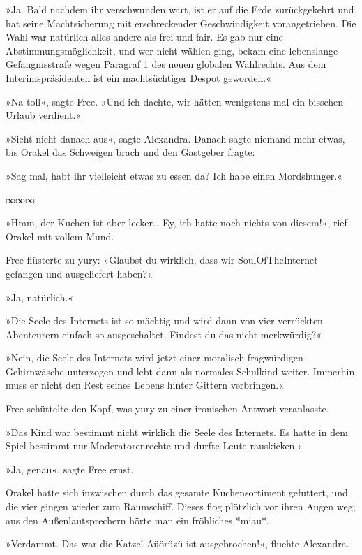 »Ja. Bald nachdem ihr verschwunden wart, ist er auf die Erde zurückgekehrt und hat seine Machtsicherung mit erschreckender Geschwindigkeit vorangetrieben. Die Wahl war natürlich alles andere als frei und fair. Es gab nur eine Abstimmungsmöglichkeit, und wer nicht wählen ging, bekam eine lebenslange Gefängnisstrafe wegen Paragraf 1 des neuen globalen Wahlrechts. Aus dem Interimspräsidenten ist ein machtsüchtiger Despot geworden.«

»Na toll«, sagte Free. »Und ich dachte, wir hätten wenigstens mal ein bisschen Urlaub verdient.«

»Sieht nicht danach aus«, sagte Alexandra. Danach sagte niemand mehr etwas, bis Orakel das Schweigen brach und den Gastgeber fragte:

»Sag mal, habt ihr vielleicht etwas zu essen da? Ich habe einen Mordshunger.«

\begin{center}
    ∞∞∞
\end{center}

»Hmm, der Kuchen ist aber lecker… Ey, ich hatte noch nichts von diesem!«, rief Orakel mit vollem Mund.

Free flüsterte zu yury: »Glaubst du wirklich, dass wir SoulOfTheInternet gefangen und ausgeliefert haben?«

»Ja, natürlich.«

»Die Seele des Internets ist so mächtig und wird dann von vier verrückten Abenteurern einfach so ausgeschaltet. Findest du das nicht merkwürdig?«

»Nein, die Seele des Internets wird jetzt einer moralisch fragwürdigen Gehirnwäsche unterzogen und lebt dann als normales Schulkind weiter. Immerhin muss er nicht den Rest seines Lebens hinter Gittern verbringen.«

Free schüttelte den Kopf, was yury zu einer ironischen Antwort veranlasste.

»Das Kind war bestimmt nicht wirklich die Seele des Internets. Es hatte in dem Spiel bestimmt nur Moderatorenrechte und durfte Leute rauskicken.«

»Ja, genau«, sagte Free ernst.

Orakel hatte sich inzwischen durch das gesamte Kuchensortiment gefuttert, und die vier gingen wieder zum Raumschiff. Dieses flog plötzlich vor ihren Augen weg; aus den Außenlautsprechern hörte man ein fröhliches *miau*.

»Verdammt. Das war die Katze! Äüörüzü ist ausgebrochen!«, fluchte Alexandra.

